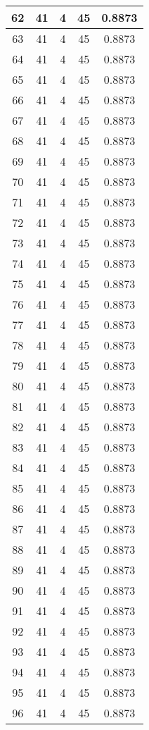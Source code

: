 \documentclass[letterpaper, 12pt]{article}
\begin{document}
\begin{longtable}{|c|c|c|c|c|}
\hline
62 & 41 & 4 & 45 & 0.8873 \\
\hline
63 & 41 & 4 & 45 & 0.8873 \\
\hline
64 & 41 & 4 & 45 & 0.8873 \\
\hline
65 & 41 & 4 & 45 & 0.8873 \\
\hline
66 & 41 & 4 & 45 & 0.8873 \\
\hline
67 & 41 & 4 & 45 & 0.8873 \\
\hline
68 & 41 & 4 & 45 & 0.8873 \\
\hline
69 & 41 & 4 & 45 & 0.8873 \\
\hline
70 & 41 & 4 & 45 & 0.8873 \\
\hline
71 & 41 & 4 & 45 & 0.8873 \\
\hline
72 & 41 & 4 & 45 & 0.8873 \\
\hline
73 & 41 & 4 & 45 & 0.8873 \\
\hline
74 & 41 & 4 & 45 & 0.8873 \\
\hline
75 & 41 & 4 & 45 & 0.8873 \\
\hline
76 & 41 & 4 & 45 & 0.8873 \\
\hline
77 & 41 & 4 & 45 & 0.8873 \\
\hline
78 & 41 & 4 & 45 & 0.8873 \\
\hline
79 & 41 & 4 & 45 & 0.8873 \\
\hline
80 & 41 & 4 & 45 & 0.8873 \\
\hline
81 & 41 & 4 & 45 & 0.8873 \\
\hline
82 & 41 & 4 & 45 & 0.8873 \\
\hline
83 & 41 & 4 & 45 & 0.8873 \\
\hline
84 & 41 & 4 & 45 & 0.8873 \\
\hline
85 & 41 & 4 & 45 & 0.8873 \\
\hline
86 & 41 & 4 & 45 & 0.8873 \\
\hline
87 & 41 & 4 & 45 & 0.8873 \\
\hline
88 & 41 & 4 & 45 & 0.8873 \\
\hline
89 & 41 & 4 & 45 & 0.8873 \\
\hline
90 & 41 & 4 & 45 & 0.8873 \\
\hline
91 & 41 & 4 & 45 & 0.8873 \\
\hline
92 & 41 & 4 & 45 & 0.8873 \\
\hline
93 & 41 & 4 & 45 & 0.8873 \\
\hline
94 & 41 & 4 & 45 & 0.8873 \\
\hline
95 & 41 & 4 & 45 & 0.8873 \\
\hline
96 & 41 & 4 & 45 & 0.8873 \\

\end{longtable}
\end{document}
